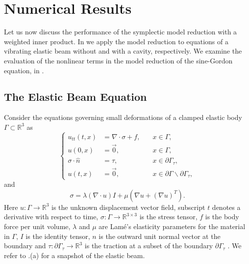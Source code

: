 \section{Numerical Results} \label{sec:res}
Let us now discuss the performance of the symplectic model reduction with a weighted inner product. In  we apply the model reduction to equations of a vibrating elastic beam without and with a cavity, respectively. We examine the evaluation of the nonlinear terms in the model reduction of the sine-Gordon equation, in .

\subsection{The Elastic Beam Equation} \label{sec:res.1}
Consider the equations governing small deformations of a clamped elastic body $\Gamma\subset \mathbb R^{3}$ as 
\begin{equation} \label{eq:res.1}
\left\{
\begin{aligned}
	u_{tt}(t,x) &= \nabla \cdot \sigma + f, \quad & x\in \Gamma, \\
	u(0,x) &= \vec 0, & x\in \Gamma,\\
	\sigma \cdot \hat n &= \tau, & x \in \partial \Gamma_\tau,\\
	u(t,x) &= \vec 0, & x \in\partial \Gamma \backslash \partial \Gamma_\tau,
\end{aligned}
\right.
\end{equation}
and
\begin{equation}  \label{eq:res.2}
	\sigma = \lambda (\nabla \cdot u) I + \mu(\nabla u + (\nabla u)^T).
\end{equation}
Here $u:\Gamma \to \mathbb{R}^3$ is the unknown displacement vector field, subscript $t$ denotes a derivative with respect to time, $\sigma:\Gamma \to \mathbb{R}^{3\times 3}$ is the stress tensor, $f$ is the body force per unit volume, $\lambda$ and $\mu$ are Lam\'e's elasticity parameters for the material in $\Gamma$, $I$ is the identity tensor, $n$ is the outward unit normal vector at the boundary and $\tau:\partial \Gamma_\tau \to \mathbb R^3$ is the traction at a subset of the boundary $\partial \Gamma_\tau$ \cite{langtangen2017solving}. We refer to .(a) for a snapshot of the elastic beam.

